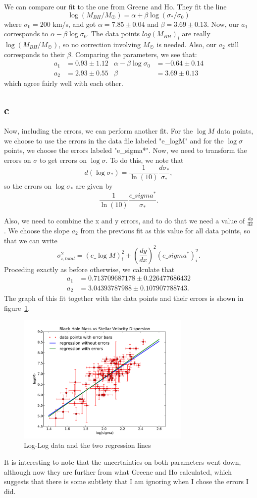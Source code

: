\documentclass[11pt,letterpaper]{article}
\begin{document}
We can compare our fit to the one from Greene and Ho. They fit the line
$$ \log(M_{BH} / M_{\astrosun}) = \alpha + \beta \log(\sigma_* / \sigma_0) $$ where 
$\sigma_0 = 200$ km/s, and got $\alpha = 7.85 \pm 0.04$ and $\beta = 3.69 \pm 0.13$.
Now, our $a_1$ corresponds to $\alpha - \beta \log\sigma_0$. 
The data points $log(M_{BH})_i$ are really $\log(M_{BH} / M_{\astrosun})$, so no
correction involving $M_{\astrosun}$ is needed. Also, our $a_2$ still 
corresponds to their $\beta$. 
Comparing the parameters, we see that:
\begin{align*}
a_1 &= 0.93 \pm 1.12 & \alpha - \beta \log\sigma_0 &= -0.64 \pm 0.14 \\
a_2 &= 2.93 \pm 0.55 & \beta &= 3.69 \pm 0.13
\end{align*}
which agree fairly well with each other.

\subsection*{c}

Now, including the errors, we can perform another fit. For the $\log M$ data points,
we choose to use the errors in the data file labeled "e\_logM" and for the 
$\log\sigma$ points, we choose the errors labeled "e\_sigma*". Now, we need
to transform the errors on $\sigma$ to get errors on $\log\sigma$. To do this, we
note that 
$$d(\log\sigma_*)= \frac{1}{\ln(10)} \frac{d\sigma_*}{\sigma_*},$$
so the errors on $\log\sigma_*$ are given by 
$$\frac{1}{\ln(10)} \frac{e\_sigma^*}{\sigma_*}.$$

Also, we need to combine the x and y errors, and to do that we need a value of 
$\frac{dy}{dx}$. We choose the slope $a_2$ from the previous fit as this value
for all data points, so that we can write
$$ \sigma_{i,total}^2 = (e\_\log M)_{i}^2 + \left(\frac{dy}{dx}\right)^2(e\_sigma^*)_i^2. $$
Proceding exactly as before otherwise, we calculate that 
\begin{align*}
a_1 &=  0.713709687178 \pm 0.226477686432 \\
a_2 &= 3.04393787988 \pm 0.107907788743.
\end{align*}
The graph of this fit together with the data points and their errors 
is shown in figure~\ref{fig:5c}.

\begin{figure}[bth]
\centering
\includegraphics[width=0.75\textwidth]{ws5-c.pdf}
\caption{Log-Log data and the two regression lines}
\label{fig:5c}
\end{figure}

It is interesting to note that the uncertainties 
on both parameters went down, although now they are further from what Greene 
and Ho calculated, which suggests that there is some subtlety that I am ignoring
when I chose the errors I did.
\end{document}
